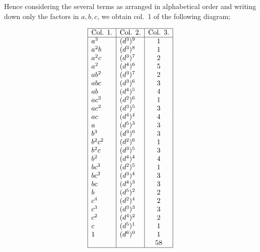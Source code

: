 \documentclass[11pt]{article}
\begin{document}
\medskip

\noindent Hence considering the several terms as arranged in alphabetical order and writing down only the factors in $a, b, c$, we obtain col.~1 of the following diagram;

\medskip

\noindent
\renewcommand{\arraystretch}{1.18}
\[
\begin{array}{|l|l|c|}
\hline
\text{Col. 1.} & \text{Col. 2.} & \text{Col. 3.}\\
\hline
a^3             & (d^3)^9           & 1\\
a^2 b           & (d^3)^8           & 1\\
a^2 c           & (d^3)^7           & 2\\
a^2             & (d^4)^6           & 5\\
a b^2           & (d^3)^7           & 2\\
a b c           & (d^3)^6           & 3\\
a b             & (d^4)^5           & 4\\
a c^3           & (d^2)^6           & 1\\
a c^2           & (d^3)^5           & 3\\
a c             & (d^4)^4           & 4\\
a               & (d^5)^3           & 3\\
b^3             & (d^3)^6           & 3\\
b^2 c^2         & (d^2)^6           & 1\\
b^2 c           & (d^3)^5           & 3\\
b^2             & (d^4)^4           & 4\\
b c^3           & (d^2)^5           & 1\\
b c^2           & (d^3)^4           & 3\\
b c             & (d^4)^3           & 3\\
b               & (d^5)^2           & 2\\
c^4             & (d^2)^4           & 2\\
c^3             & (d^3)^3           & 3\\
c^2             & (d^4)^2           & 2\\
c               & (d^5)^1           & 1\\
1               & (d^6)^0           & 1\\
                &                   & 58\\
\hline
\end{array}
\]
\end{document}
